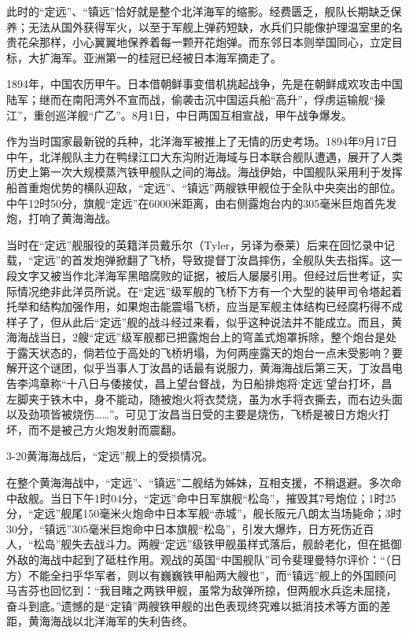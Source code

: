 \documentclass[12pt,UTF8]{ctexbook}
\begin{document}
此时的“定远”、“镇远”恰好就是整个北洋海军的缩影。经费匮乏，舰队长期缺乏保养；无法从国外获得军火，以至于军舰上弹药短缺，水兵们只能像护理温室里的名贵花朵那样，小心翼翼地保养着每一颗开花炮弹。而东邻日本则举国同心，立定目标，大扩海军。亚洲第一的桂冠已经被日本海军摘走了。

1894年，中国农历甲午。日本借朝鲜事变借机挑起战争，先是在朝鲜成欢攻击中国陆军；继而在南阳湾外不宣而战，偷袭击沉中国运兵船“高升”，俘虏运输舰“操江”，重创巡洋舰“广乙”。8月1日，中日两国互相宣战，甲午战争爆发。

作为当时国家最新锐的兵种，北洋海军被推上了无情的历史考场。1894年9月17日中午，北洋舰队主力在鸭绿江口大东沟附近海域与日本联合舰队遭遇，展开了人类历史上第一次大规模蒸汽铁甲舰队之间的海战。海战伊始，中国舰队采用利于发挥船首重炮优势的横队迎敌，“定远”、“镇远”两艘铁甲舰位于全队中央突出的部位。中午12时50分，旗舰“定远”在6000米距离，由右侧露炮台内的305毫米巨炮首先发炮，打响了黄海海战。

当时在“定远”舰服役的英籍洋员戴乐尔（Tyler，另译为泰莱）后来在回忆录中记载，“定远”的首发炮弹掀翻了飞桥，导致提督丁汝昌摔伤，全舰队失去指挥。这一段文字又被当作北洋海军黑暗腐败的证据，被后人屡屡引用。但经过后世考证，实际情况绝非此洋员所说。在“定远”级军舰的飞桥下方有一个大型的装甲司令塔起着托举和结构加强作用，如果炮击能震塌飞桥，应当是军舰主体结构已经腐朽得不成样子了，但从此后“定远”舰的战斗经过来看，似乎这种说法并不能成立。而且，黄海海战当日，2艘“定远”级军舰都已把露炮台上的穹盖式炮罩拆除，整个炮台是处于露天状态的，倘若位于高处的飞桥坍塌，为何两座露天的炮台一点未受影响？要解开这个谜团，似乎当事人丁汝昌的话最有说服力，黄海海战后第三天，丁汝昌电告李鸿章称“十八日与倭接仗，昌上望台督战，为日船排炮将‘定远’望台打坏，昌左脚夹于铁木中，身不能动，随被炮火将衣焚烧，虽为水手将衣撕去，而右边头面以及劲项皆被烧伤……”。可见丁汝昌当日受的主要是烧伤，飞桥是被日方炮火打坏，而不是被己方火炮发射而震翻。

3-20黄海海战后，“定远”舰上的受损情况。

在整个黄海海战中，“定远”、“镇远”二舰结为姊妹，互相支援，不稍退避。多次命中敌舰。当日下午1时04分，“定远”命中日军旗舰“松岛”，摧毁其7号炮位；1时25分，“定远”舰尾150毫米火炮命中日本军舰“赤城”，舰长阪元八朗太当场毙命；3时30分，“镇远”305毫米巨炮命中日本旗舰“松岛”，引发大爆炸，日方死伤近百人，“松岛”舰失去战斗力。两艘“定远”级铁甲舰虽样式落后，舰龄老化，但在抵御外敌的海战中起到了砥柱作用。观战的英国“中国舰队”司令斐理曼特尔评价：“（日方）不能全扫乎华军者，则以有巍巍铁甲船两大艘也”，而“镇远”舰上的外国顾问马吉芬也回忆到：“我目睹之两铁甲舰，虽常为敌弹所掠，但两舰水兵迄未屈挠，奋斗到底。”遗憾的是“定镇”两艘铁甲舰的出色表现终究难以抵消技术等方面的差距，黄海海战以北洋海军的失利告终。
\end{document}
